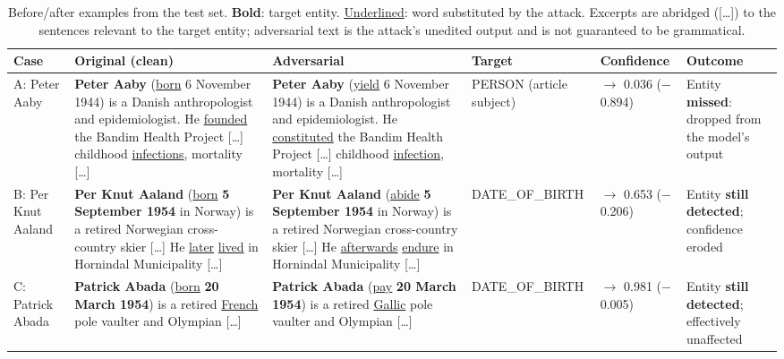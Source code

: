 \documentclass[conference]{IEEEtran}
\begin{document}
\begin{table}[!ht]
\centering
\caption{Before/after examples from the test set. \textbf{Bold}: target entity. \underline{Underlined}: word substituted by the attack. Excerpts are abridged ([\ldots]) to the sentences relevant to the target entity; adversarial text is the attack's unedited output and is not guaranteed to be grammatical.}
\label{tab:cases}
\footnotesize
\setlength{\tabcolsep}{3pt}
\renewcommand{\arraystretch}{1.25}
\begin{tabular}{@{}>{\raggedright\arraybackslash}p{1.5cm}>{\raggedright\arraybackslash}p{4.3cm}>{\raggedright\arraybackslash}p{4.3cm}>{\raggedright\arraybackslash}p{1.9cm}>{\raggedright\arraybackslash}p{1.9cm}>{\raggedright\arraybackslash}p{2.1cm}@{}}
\toprule
\textbf{Case} & \textbf{Original (clean)} & \textbf{Adversarial} & \textbf{Target} & \textbf{Confidence} & \textbf{Outcome} \\
\midrule
A: Peter Aaby &
\textbf{Peter Aaby} (\underline{born} 6 November 1944) is a Danish anthropologist and epidemiologist. He \underline{founded} the Bandim Health Project [\ldots] childhood \underline{infections}, mortality [\ldots] &
\textbf{Peter Aaby} (\underline{yield} 6 November 1944) is a Danish anthropologist and epidemiologist. He \underline{constituted} the Bandim Health Project [\ldots] childhood \underline{infection}, mortality [\ldots] &
PERSON (article subject) &
0.930 $\to$ 0.036 ($-$0.894) &
Entity \textbf{missed}: dropped from the model's output \\
B: Per Knut Aaland &
\textbf{Per Knut Aaland} (\underline{born} \textbf{5 September 1954} in Norway) is a retired Norwegian cross-country skier [\ldots] He \underline{later} \underline{lived} in Hornindal Municipality [\ldots] &
\textbf{Per Knut Aaland} (\underline{abide} \textbf{5 September 1954} in Norway) is a retired Norwegian cross-country skier [\ldots] He \underline{afterwards} \underline{endure} in Hornindal Municipality [\ldots] &
DATE\_OF\_\allowbreak BIRTH &
0.859 $\to$ 0.653 ($-$0.206) &
Entity \textbf{still detected}; confidence eroded \\
C: Patrick Abada &
\textbf{Patrick Abada} (\underline{born} \textbf{20 March 1954}) is a retired \underline{French} pole vaulter and Olympian [\ldots] &
\textbf{Patrick Abada} (\underline{pay} \textbf{20 March 1954}) is a retired \underline{Gallic} pole vaulter and Olympian [\ldots] &
DATE\_OF\_\allowbreak BIRTH &
0.986 $\to$ 0.981 ($-$0.005) &
Entity \textbf{still detected}; effectively unaffected \\
\bottomrule
\end{tabular}
\end{table}
\end{document}

